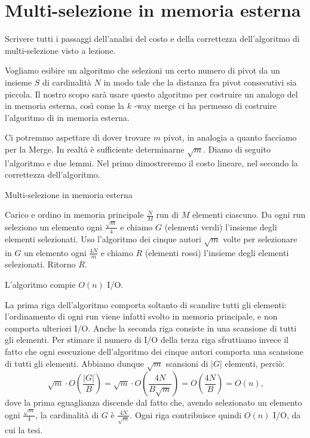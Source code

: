 \chapter{Multi-selezione in memoria esterna}    

\begin{problem*}
    Scrivere tutti i passaggi dell'analisi del costo e della correttezza
    dell'algoritmo di multi-selezione visto a lezione.
\end{problem*}

Vogliamo esibire un algoritmo che selezioni un certo numero di pivot da un
insieme \(S\) di cardinalit\`a \(N\) in modo tale che la distanza fra pivot
consecutivi sia piccola. Il nostro scopo sar\`a usare questo algoritmo per
costruire un analogo del \quicksort in memoria esterna, cos\`i come la \(k\)
-way merge ci ha permesso di costruire l'algoritmo di \mergesort in 
memoria esterna.

Ci potremmo aspettare di dover trovare \(m\) pivot, in analogia a quanto
facciamo per la Merge. In realt\`a \`e sufficiente determinarne \(\sqrt{m}\).
Diamo di seguito l'algoritmo e due lemmi. Nel primo dimostreremo il costo
lineare, nel secondo la correttezza dell'algoritmo.

\begin{algorithm}
    \caption{Multi-selezione in memoria esterna}
    \begin{algorithmic}[1]
        \STATE Carico e ordino in memoria principale \(\frac{N}{M}\) run
        di \(M\) elementi ciascuno.
        \STATE Da ogni run seleziono un elemento ogni 
        \(\frac{\sqrt{m}}{4}\) e chiamo \(G\) (elementi verdi) l'insieme 
        degli elementi selezionati.
        \STATE Uso l'algoritmo dei cinque autori \(\sqrt{m}\) volte per
        selezionare in \(G\) un elemento ogni \(\frac{4N}{m}\) e chiamo 
        \(R\) (elementi rossi) l'insieme degli elementi selezionati.
        \STATE Ritorno \(R\).
    \end{algorithmic}
\end{algorithm}

\begin{lemma}[Costo]
    L'algoritmo compie \(O(n)\) I/O.
\end{lemma}
\begin{proof*}
    La prima riga dell'algoritmo comporta soltanto di scandire tutti gli
    elementi: l'ordinamento di ogni run viene infatti svolto in memoria
    principale, e non comporta ulteriori I/O. Anche la seconda riga
    consiste in una scansione di tutti gli elementi. Per stimare il numero
    di I/O della terza riga sfruttiamo invece il fatto che ogni esecuzione
    dell'algoritmo dei cinque autori comporta una scansione di tutti gli
    elementi. Abbiamo dunque \(\sqrt{m}\) scansioni di \(|G|\) elementi,
    perci\`o:
    \[
        \sqrt{m}\cdot O\left(\frac{|G|}{B}\right) = \sqrt{m}\cdot O\left(\frac{4N}{B\sqrt{m}}\right) = O\left(\frac{4N}{B}\right) = O(n)\mbox{,}
    \]
    dove la prima eguaglianza discende dal fatto che, avendo selezionato
    un elemento ogni \(\frac{\sqrt{m}}{4}\), la cardinalit\`a di \(G\) \`e
    \(\frac{4N}{\sqrt{m}}\). Ogni riga contribuisce quindi \(O(n)\) I/O, da cui la tesi.
\end{proof*}

